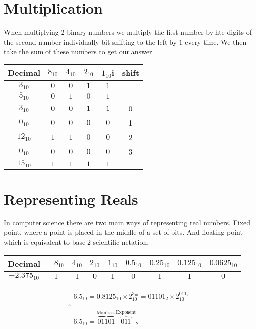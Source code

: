 \documentclass{article}
\begin{document}
\section{Multiplication}
When multiplying 2 binary numbers we multiply the first number by hte digits of the second number
individually bit shifting to the left by $1$ every time. We then take the sum of these numbers to
get our answer.

\begin{center}
  \begin{tabular}{c | c | c | c | c | c}
    Decimal & $8_{10}$ & $4_{10}$ & $2_{10}$ & $1_{10}$i & shift\\ \hline
    $3_{10}$ & $0$ & $0$ & $1$ & $1$ & \\
    $5_{10}$ & $0$ & $1$ & $0$ & $1$ &\\ \hline
    $3_{10}$& $0$ &  $0$ & $1$ & $1$ & 0\\
    $0_{10}$& $0$ &  $0$ & $0$ & $0$ & 1\\
    $12_{10}$& $1$ &  $1$ & $0$ & $0$& 2\\
    $0_{10}$& $0$ &  $0$ & $0$ & $0$& 3\\ \hline
    $15_{10}$& $1$ &  $1$ & $1$ & $1$\\
  \end{tabular}
\end{center}

\section{Representing Reals}
In computer science there are two main ways of representing real numbers. Fixed point, where a point is placed in the middle of
a set of bits. And floating point which is equivalent to base $2$ scientific notation.

\begin{center}
  \begin{tabular}{ | c | c | c | c | c | c | c | c | c |}
    \hline
    Decimal & $-8_{10}$ & $4_{10}$ & $2_{10}$ & $1_{10}$ & $0.5_{10}$ & $0.25_{10}$ & $0.125_{10}$ & $0.0625_{10}$\\ \hline
    $-2.375_{10}$ & $1$ & $1$ & $0$ & $1$ & $0$ & $1$ & $1$ & $0$\\ 
    \hline
  \end{tabular}
\end{center}

\begin{gather}
	-6.5_{10} = 0.8125_{10} \times 2_{10}^{3_{10}} = 01101_2 \times 2_{10}^{011_2} \\
	\therefore \\
	-6.5_{10} = {\overbrace{01101}^{\text{Mantissa}}\overbrace{011}^{\text{Exponent}}}_2
\end{gather}
\end{document}
